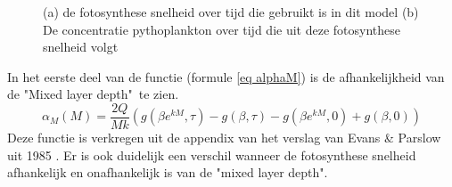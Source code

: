 \begin{figure}[H]
    \centering
    
    \caption{(a) de fotosynthese snelheid over tijd die gebruikt is in dit model (b) De concentratie pythoplankton over tijd die uit deze fotosynthese snelheid volgt}
    \label{alpha}
\end{figure}

In het eerste deel van de functie (formule \eqref{eq alphaM}) is de afhankelijkheid van de "Mixed layer depth"\ te zien.
\begin{equation}
    \alpha_{M}(M)=\frac{2Q}{Mk}\left(g(\beta e^{kM},\tau)-g(\beta,\tau)-g(\beta e^{kM},0)+g(\beta,0) \right)
    \label{eq alphaM}
\end{equation}
Deze functie is verkregen uit de appendix van het verslag van Evans \& Parslow uit 1985 \cite{Algen1985}.
Er is ook duidelijk een verschil wanneer de fotosynthese snelheid afhankelijk en onafhankelijk is van de "mixed layer depth". 

